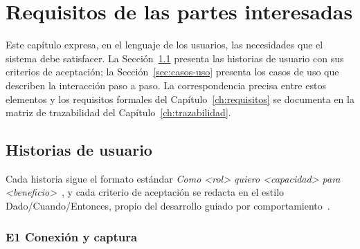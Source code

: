 \documentclass[11pt,a4paper]{report}
\begin{document}
\chapter{Requisitos de las partes interesadas}
\label{ch:interesados}

Este cap\'itulo expresa, en el lenguaje de los usuarios, las necesidades que el sistema debe satisfacer. La Secci\'on~\ref{sec:historias} presenta las historias de usuario con sus criterios de aceptaci\'on; la Secci\'on~\ref{sec:casos-uso} presenta los casos de uso que describen la interacci\'on paso a paso. La correspondencia precisa entre estos elementos y los requisitos formales del Cap\'itulo~\ref{ch:requisitos} se documenta en la matriz de trazabilidad del Cap\'itulo~\ref{ch:trazabilidad}.

\section{Historias de usuario}
\label{sec:historias}

Cada historia sigue el formato est\'andar \textit{Como \textless rol\textgreater{} quiero \textless capacidad\textgreater{} para \textless beneficio\textgreater}~\cite{R22}, y cada criterio de aceptaci\'on se redacta en el estilo Dado/Cuando/Entonces, propio del desarrollo guiado por comportamiento~\cite{R26}.

\subsection{E1 Conexión y captura}
\end{document}
